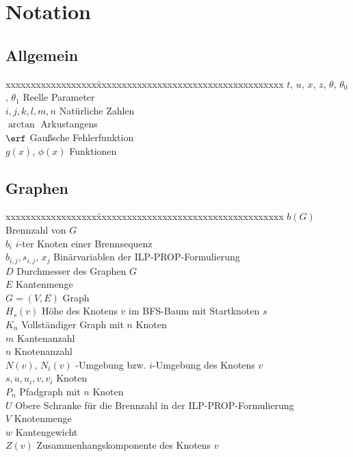\section*{Notation}
\subsection*{Allgemein}
\begin{tabbing}
xxxxxxxxxxxxxxxxxx\=xxxxxxxxxxxxxxxxxxxxxxxxxxxxxxxxxxxxx\kill
$t$, $u$, $x$, $z$, $\theta$, $\theta_0$, $\theta_1$ \>Reelle Parameter \\
$i, j, k, l, m, n$ \>Natürliche Zahlen \\
$\arctan$ \>Arkustangens \\
$\erf$ \>Gaußsche Fehlerfunktion \\
$g(x)$, $\phi(x)$ \>Funktionen \\
\end{tabbing}
\subsection*{Graphen}
\begin{tabbing}
xxxxxxxxxxxxxxxxxx\=xxxxxxxxxxxxxxxxxxxxxxxxxxxxxxxxxxxxx\kill
$b(G)$ \>Brennzahl von $G$ \\
$b_i$ \>$i$-ter Knoten einer Brennsequenz \\
$b_{i,j}, s_{i,j}$, $x_j$ \>Binärvariablen der ILP-PROP-Formulierung \\
$D$ \>Durchmesser des Graphen $G$ \\
$E$ \>Kantenmenge \\
$G = (V, E)$ \>Graph \\
$H_s(v)$ \>Höhe des Knotens $v$ im BFS-Baum mit Startknoten $s$ \\
$K_n$ \>Vollständiger Graph mit $n$ Knoten \\
$m$ \>Kantenanzahl \\
$n$ \>Knotenanzahl \\
$N(v)$, $N_i(v)$ -Umgebung bzw. $i$-Umgebung des Knotens $v$ \\
$s, u, u_i, v, v_i$ \>Knoten \\
$P_n$ \>Pfadgraph mit $n$ Knoten \\
$U$ \>Obere Schranke für die Brennzahl in der ILP-PROP-Formulierung\\
$V$ \>Knotenmenge \\
$w$ \>Kantengewicht \\
$Z(v)$ \>Zusammenhangskomponente des Knotens $v$ \\
\end{tabbing}
